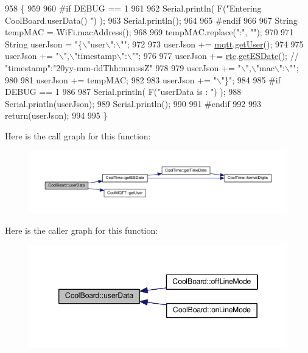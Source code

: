 \begin{DoxyCode}
958 \{
959 
960 \textcolor{preprocessor}{#if DEBUG == 1}
961 
962     Serial.println( F(\textcolor{stringliteral}{"Entering CoolBoard.userData() "}) );
963     Serial.println();
964 
965 \textcolor{preprocessor}{#endif}
966 
967     String tempMAC = WiFi.macAddress();
968 
969     tempMAC.replace(\textcolor{stringliteral}{":"}, \textcolor{stringliteral}{""});
970 
971     String userJson = \textcolor{stringliteral}{"\{\(\backslash\)"user\(\backslash\)":\(\backslash\)""};
972 
973     userJson += \hyperlink{classCoolBoard_a2399f44d7c23c1149a335cb3b46d90f1}{mqtt}.\hyperlink{classCoolMQTT_a373cc92fca7760d886f02d8a6e5b3f63}{getUser}();
974 
975     userJson += \textcolor{stringliteral}{"\(\backslash\)",\(\backslash\)"timestamp\(\backslash\)":\(\backslash\)""};
976 
977     userJson += \hyperlink{classCoolBoard_a50d2a6716879d64a85f3c6b44ad63275}{rtc}.\hyperlink{classCoolTime_ac4f32ee513c1328d984306645e8785a4}{getESDate}(); \textcolor{comment}{// "timestamp":"20yy-mm-ddThh:mm:ssZ"}
978 
979     userJson += \textcolor{stringliteral}{"\(\backslash\)",\(\backslash\)"mac\(\backslash\)":\(\backslash\)""};
980 
981     userJson += tempMAC;
982 
983     userJson += \textcolor{stringliteral}{"\(\backslash\)"\}"};
984 
985 \textcolor{preprocessor}{#if DEBUG == 1}
986 
987     Serial.println( F(\textcolor{stringliteral}{"userData is : "}) );
988     Serial.println(userJson);
989     Serial.println();
990 
991 \textcolor{preprocessor}{#endif  }
992     
993     \textcolor{keywordflow}{return}(userJson);
994     
995 \}
\end{DoxyCode}
Here is the call graph for this function\+:\nopagebreak
\begin{figure}[H]
\begin{center}
\leavevmode
\includegraphics[width=350pt]{classCoolBoard_ae7358fb6e623cfc81b775f5f1734909b_cgraph}
\end{center}
\end{figure}
Here is the caller graph for this function\+:\nopagebreak
\begin{figure}[H]
\begin{center}
\leavevmode
\includegraphics[width=346pt]{classCoolBoard_ae7358fb6e623cfc81b775f5f1734909b_icgraph}
\end{center}
\end{figure}


